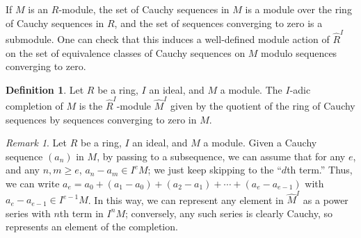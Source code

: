 \documentclass{amsart}[12pt]
\numberwithin{equation}{section}
\theoremstyle{plain} %
\theoremstyle{definition}
\newtheorem{defn}[equation]{Definition}
\theoremstyle{remark}
\newtheorem{rem}[equation]{Remark}
\begin{document}

If $M$ is an $R$-module, the set of Cauchy sequences in $M$ is a module over the ring of Cauchy sequences in $R$, and the set of sequences converging to zero is a submodule. One can check that this induces a well-defined module action of $\hat{R}^I$ on the set of equivalence classes of Cauchy sequences on $M$ modulo sequences converging to zero.

\begin{defn} Let $R$ be a ring, $I$ an ideal, and $M$ a module. The $I$-adic completion of $M$ is the  $\hat{R}^I$-module $\hat{M}^I$ given by the quotient of the ring of Cauchy sequences by sequences converging to zero in $M$.
\end{defn}

\begin{rem} Let $R$ be a ring, $I$ an ideal, and $M$ a module. Given a Cauchy sequence $(a_n)$ in $M$, by passing to a subsequence, we can assume that for any $e$,  and any $n,m\geq e$, $a_n - a_m \in I^e M$; we just keep skipping to the ``$d$th term.'' Thus, we can write $a_e = a_0 + (a_1-a_0) + (a_2-a_1) + \cdots + (a_e-a_{e-1})$ with $a_e-a_{e-1} \in I^{e-1} M$. In this way, we can represent any element in $\hat{M}^{I}$ as a power series with $n$th term in $I^n M$; conversely, any such series is clearly Cauchy, so represents an element of the completion.
\end{rem}
\end{document}

